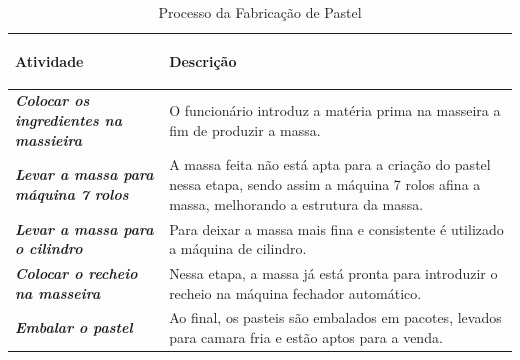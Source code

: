 \begin{table}[H]
    \centering
      \begin{tabular}{| m{8cm} | m{8cm} |}
        \hline
        \begin{center} \textbf{Atividade} \end{center}	&	\begin{center} \textbf{Descrição} \end{center}		\\ \hline
        \textit{\textbf{Colocar os ingredientes na massieira}}	&	O funcionário introduz a matéria prima na masseira a fim de produzir a massa. \\ \hline
         \textit{\textbf{Levar a massa para máquina 7 rolos}} & A massa feita não está apta para a criação do pastel nessa etapa, sendo assim a máquina 7 rolos afina a massa, melhorando a estrutura da massa. \\ \hline
        \textit{\textbf{Levar a massa para o cilindro}} &	Para deixar a massa mais fina e consistente é utilizado a máquina de cilindro. \\ \hline
        \textit{\textbf{Colocar o recheio na masseira}}	&	Nessa etapa, a massa já está pronta para introduzir o recheio na máquina fechador automático. \\ \hline
        \textit{\textbf{Embalar o pastel}}	&	Ao final, os pasteis são embalados em pacotes, levados para camara fria e estão aptos para a venda. \\ \hline
      \end{tabular}
      \caption{Processo da Fabricação de Pastel}
      \label{tabela:processofabrica}
  \end{table}